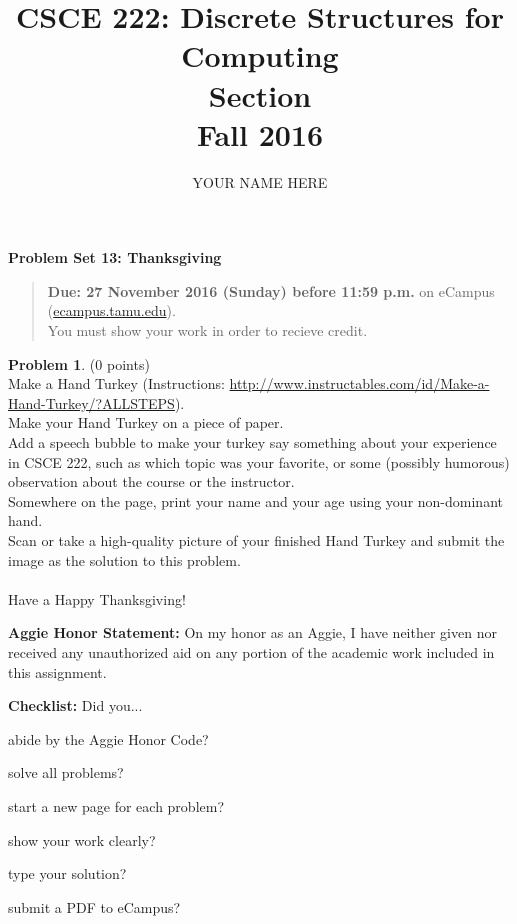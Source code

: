 \documentclass{article}
\title{CSCE 222: Discrete Structures for Computing\\Section \mysectionnumber\\Fall 2016}
\author{YOUR NAME HERE}
\theoremstyle{definition}
\newtheorem{problem}{Problem}
\newtheorem*{solution}{Solution}
\newcommand{\honor}{\noindent \textbf{Aggie Honor Statement: }On my honor as an Aggie, I have neither
  given nor received any unauthorized aid on any portion of the academic work included in this assignment.
}
\newcommand{\checklist}{\noindent\textbf{Checklist:}
Did you...
\begin{compactenum}
\item abide by the Aggie Honor Code?
\item solve all problems?
\item start a new page for each problem?
\item show your work clearly?
\item type your solution?
\item submit a PDF to eCampus?
\end{compactenum}
}
\newcommand{\problemset}[1]{\begin{center}\textbf{Problem Set #1}\end{center}}
\newcommand{\duedate}[1]{\begin{quote}\textbf{Due: #1} on eCampus (\url{ecampus.tamu.edu}). \\You must show your work in order to recieve credit.\end{quote}}
\begin{document}
\maketitle

\problemset{13: Thanksgiving}

\duedate{27 November 2016 (Sunday) before 11:59 p.m.}

\bigskip

\begin{problem} (0 points)\\
Make a Hand Turkey (Instructions: \url{http://www.instructables.com/id/Make-a-Hand-Turkey/?ALLSTEPS}).\\
Make your Hand Turkey on a piece of paper.\\
Add a speech bubble to make your turkey say something about your experience in CSCE 222, such as which topic was your favorite, or some (possibly humorous) observation about the course or the instructor.\\
Somewhere on the page, print your name and your age using your non-dominant hand.\\
Scan or take a high-quality picture of your finished Hand Turkey and submit the image as the solution to this problem.\\
\\
Have a Happy Thanksgiving!
\end{problem}




\bigskip
\honor

\bigskip
\checklist
\end{document}
